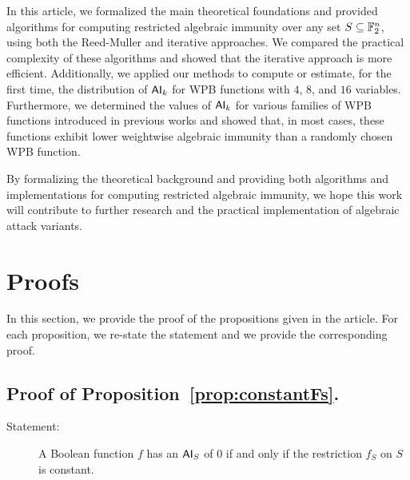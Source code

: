 \documentclass[11pt]{llncs}
\begin{document}


In this article, we formalized the main theoretical foundations and provided algorithms for computing restricted algebraic immunity over any set $S \subseteq \mathbb{F}_2^n$, using both the Reed-Muller and iterative approaches. 
We compared the practical complexity of these algorithms and showed that the iterative approach is more efficient. 
Additionally, we applied our methods to compute or estimate, for the first time, the distribution of $\mathsf{AI}_k$ for WPB functions with $4$, $8$, and $16$ variables. 
Furthermore, we determined the values of $\mathsf{AI}_k$ for various families of WPB functions introduced in previous works and showed that, in most cases, these functions exhibit lower weightwise algebraic immunity than a randomly chosen WPB function.  

By formalizing the theoretical background and providing both algorithms and implementations for computing restricted algebraic immunity, we hope this work will contribute to further research and the practical implementation of algebraic attack variants. 





\ifnum{}


\else


\fi

\newpage
\appendix

\section{Proofs}\label{sec:proofs}
In this section, we provide the proof of the propositions given in the article. 
For each proposition, we re-state the statement and we provide the corresponding proof.
\subsection{Proof of Proposition~\ref{prop:constantFs}.}
\begin{description}
    \item[Statement:] A Boolean function $f$ has an $\mathsf{AI}_S$ of $0$ if and only if the restriction $f_S$ on $S$ is constant.
\end{description}
\end{document}
